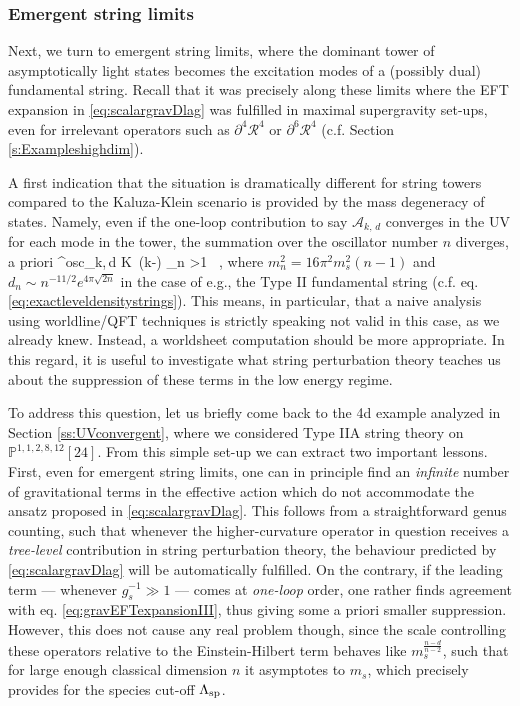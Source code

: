 \subsubsection*{Emergent string limits}

Next, we turn to emergent string limits, where the dominant tower of asymptotically light states becomes the excitation modes of a (possibly dual) fundamental string. Recall that it was precisely along these limits where the EFT expansion in \eqref{eq:scalargravDlag} was fulfilled in maximal supergravity set-ups, even for irrelevant operators such as $\partial^4 \mathcal{R}^4$ or $\partial^6 \mathcal{R}^4$ (c.f. Section \ref{s:Exampleshighdim}).

A first indication that the situation is dramatically different for string towers compared to the Kaluza-Klein scenario is provided by the mass degeneracy of states. Namely, even if the one-loop contribution to say $\mathcal{A}_{k,\,d}$ converges in the UV for each mode in the tower, the summation over the oscillator number $n$ diverges, a priori
%
\beq
{}^{\rm osc}_{k,\,d} \propto \tilde K\, \Gamma\left(k-\right) \sum_{n >1}  \to \infty\, ,
\eeq
%
where $m_n^2= 16\pi^2 m_s^2 (n-1)$ and $d_n \sim n^{-11/2} e^{4\pi \sqrt{2n}}$ in the case of e.g., the Type II fundamental string (c.f. eq. \eqref{eq:exactleveldensitystrings}). This means, in particular, that a naive analysis using worldline/QFT techniques is strictly speaking not valid in this case, as we already knew. Instead, a worldsheet computation should be more appropriate. In this regard, it is useful to investigate what string perturbation theory teaches us about the suppression of these terms in the low energy regime.  

To address this question, let us briefly come back to the 4d example analyzed in Section \ref{ss:UVconvergent}, where we considered Type IIA string theory on $\mathbb{P}^{1,1,2,8,12}[24]$. From this simple set-up we can extract two important lessons. First, even for emergent string limits, one can in principle find an \emph{infinite} number of gravitational terms in the effective action which do not accommodate the ansatz proposed in \eqref{eq:scalargravDlag}. This follows from a straightforward genus counting, such that whenever the higher-curvature operator in question receives a \emph{tree-level} contribution in string perturbation theory, the behaviour predicted by \eqref{eq:scalargravDlag} will be automatically fulfilled. On the contrary, if the leading term --- whenever $g_s^{-1} \gg 1$ --- comes at \emph{one-loop} order, one rather finds agreement with eq. \eqref{eq:gravEFTexpansionIII}, thus giving some a priori smaller suppression. %
However, this does not cause any real problem though, since the scale controlling these operators relative to the Einstein-Hilbert term behaves like $m_s^{\frac{n-d}{n-2}}$, such that for large enough classical dimension $n$ it asymptotes to $m_s$, which precisely provides for the species cut-off $\Lambda_{\text{sp}}$.

